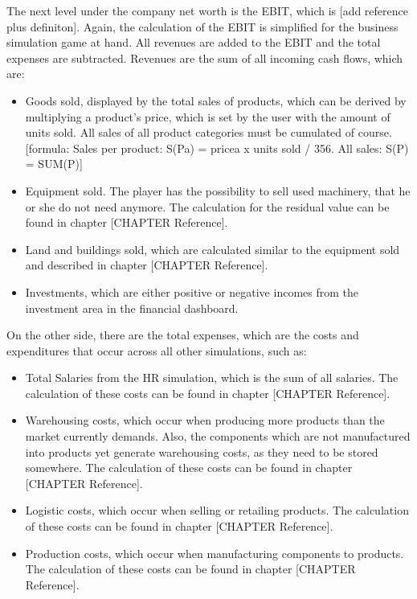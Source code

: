 The next level under the company net worth is the EBIT, which is [add reference plus definiton]. Again, the calculation of the EBIT is simplified for the business simulation game at hand. All revenues are added to the EBIT and the total expenses are subtracted. Revenues are the sum of all incoming cash flows, which are:
\begin{itemize}
    \item Goods sold, displayed by the total sales of products, which can be derived by multiplying a product’s price, which is set by the user with the amount of units sold. All sales of all product categories must be cumulated of course. [formula: 
Sales per product: S(Pa) = pricea x units sold / 356. 
All sales: S(P) = SUM(P)]
    \item Equipment sold. The player has the possibility to sell used machinery, that he or she do not need anymore. The calculation for the residual value can be found in chapter [CHAPTER Reference].
    \item Land and buildings sold, which are calculated similar to the equipment sold and described in chapter [CHAPTER Reference].
    \item Investments, which are either positive or negative incomes from the investment area in the financial dashboard.
\end{itemize}
On the other side, there are the total expenses, which are the costs and expenditures that occur across all other simulations, such as:
\begin{itemize}
    \item Total Salaries from the HR simulation, which is the sum of all salaries. The calculation of these costs can be found in chapter [CHAPTER Reference].
    \item Warehousing costs, which occur when producing more products than the market currently demands. Also, the components which are not manufactured into products yet generate warehousing costs, as they need to be stored somewhere. The calculation of these costs can be found in chapter [CHAPTER Reference]. 
    \item Logistic costs, which occur when selling or retailing products. The calculation of these costs can be found in chapter [CHAPTER Reference].
    \item Production costs, which occur when manufacturing components to products. The calculation of these costs can be found in chapter [CHAPTER Reference].
\end{itemize}

